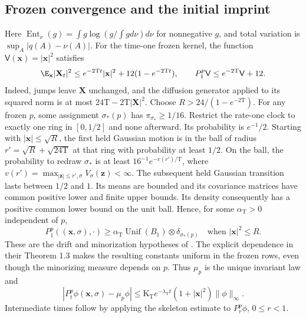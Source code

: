 \subsection*{Frozen convergence and the initial imprint}

Here \(\operatorname{Ent}_\nu(g)=\int g\log(g/\int g d\nu)d\nu\)
for nonnegative \(g\), and total variation is \(\sup_A|q(A)-\nu(A)|\).
For the time-one frozen kernel, the function
\(\mathsf V(\mathbf x)=|\mathbf x|^2\) satisfies
\begin{equation}
 \E_{\mathbf x}|\mathbf X_t|^2
 \le e^{-2\mathrm Tt}|\mathbf x|^2+12(1-e^{-2\mathrm Tt}),\qquad
 P_1^p\mathsf V\le e^{-2\mathrm T}\mathsf V+12.
\label{eq:phil-selection-moment}
\end{equation}
Indeed, jumps leave \(\mathbf X\) unchanged, and the diffusion generator
applied to its squared norm is at most \(24\mathrm T-2\mathrm T|\mathbf X|^2\).
Choose \(R>24/(1-e^{-2\mathrm T})\). For any frozen \(p\), some assignment
\(\sigma_*(p)\) has \(\pi_{\sigma_*}\ge1/16\). Restrict the rate-one
clock to exactly one ring in \([0,1/2]\) and none afterward. Its probability
is \(e^{-1}/2\). Starting with \(|\mathbf x|\le\sqrt R\), the first held
Gaussian motion is in the ball of radius
\(r'=\sqrt R+\sqrt{24\mathrm T}\) at that ring with probability at least
\(1/2\). On the ball, the probability to redraw \(\sigma_*\) is at least
\(16^{-1}e^{-v(r')/\mathrm T}\), where
\(v(r')=\max_{|\mathbf z|\le r',\sigma}V_\sigma(\mathbf z)<\infty\).
The subsequent held Gaussian transition lasts between \(1/2\) and \(1\).
Its means are bounded and its covariance matrices have common positive
lower and finite upper bounds. Its density consequently has a positive
common lower bound on the unit ball. Hence, for some \(\alpha_{\mathrm T}>0\)
independent of \(p\),
\[
 P_1^p((\mathbf x,\sigma),\cdot)
 \ge\alpha_{\mathrm T}\operatorname{Unif}(B_1)
                         \otimes\delta_{\sigma_*(p)}
 \quad\text{when }|\mathbf x|^2\le R.
\]
These are the drift and minorization hypotheses of
\citet[Assumptions 1--2 and Theorems 1.2--1.3]{HairerMattingly2011}.
The explicit dependence in their Theorem 1.3 makes the resulting constants
uniform in the frozen rows, even though the minorizing measure depends on
\(p\). Thus \(\mu_p\) is the unique invariant law and
\begin{equation}
 |P_t^p\phi(\mathbf x,\sigma)-\mu_p\phi|
 \le\mathrm K_{\mathrm T}e^{-\lambda_{\mathrm T}t}
       (1+|\mathbf x|^2)\|\phi\|_\infty.
\label{eq:phil-selection-harris}
\end{equation}
Intermediate times follow by applying the skeleton estimate to
\(P_r^p\phi\), \(0\le r<1\).

